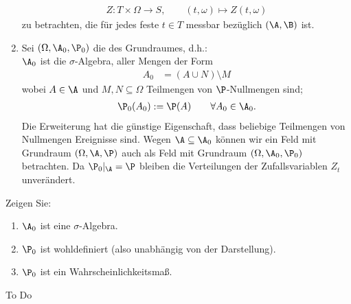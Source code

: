 \begin{bemerkungnr}
\begin{enumerate}[label=(\arabic*)]
		\begin{align*}
			Z:T\times\Omega\to S,\qquad (t,\omega)\mapsto Z(t,\omega)
		\end{align*}
		zu betrachten, die für jedes feste $t\in T$ messbar bezüglich $(\A,\B)$ ist.
		\item Sei $(\Omega,\A_0,\P_0)$ die  des Grundraumes, d.h.: \\
		$\A_0$ ist die $\sigma$-Algebra, aller Mengen der Form
		\begin{align*}
			A_0&=(A\cup N)\setminus M
		\end{align*}
		wobei $A\in\A$ und $M,N\subseteq\Omega$ Teilmengen von $\P$-Nullmengen sind; %
		\begin{align*}
			\P_0(A_0):=\P(A)\qquad\forall A_0\in\A_0.
		\end{align*}
		Die Erweiterung hat die günstige Eigenschaft, dass beliebige Teilmengen von Nullmengen Ereignisse sind.
		Wegen $\A\subseteq\A_0$ können wir ein Feld mit Grundraum $(\Omega,\A,\P)$ auch als Feld mit Grundraum $(\Omega,\A_0,\P_0)$ betrachten.
		Da $\P_0|_\A=\P$ bleiben die Verteilungen der Zufallsvariablen $Z_t$ unverändert.
	\end{enumerate}
\end{bemerkungnr}

\begin{aufgabe}[1.3.2.7]
	Zeigen Sie:
	\begin{enumerate}
		\item $\A_0$ ist eine $\sigma$-Algebra.
		\item $\P_0$ ist wohldefiniert (also unabhängig von der Darstellung).
		\item $\P_0$ ist ein Wahrscheinlichkeitsmaß.
	\end{enumerate}
\end{aufgabe}

\begin{lösung}
	To Do %
\end{lösung}

